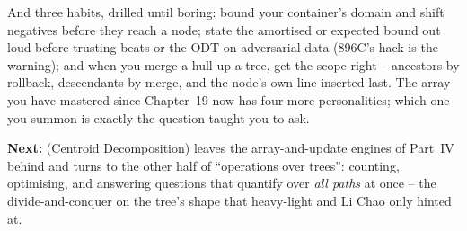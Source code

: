 \begin{lastword}
\medskip
And three habits, drilled until boring: bound your container's domain and shift negatives before they
reach a node; state the amortised or expected bound out loud before trusting beats or the ODT on
adversarial data (896C's hack is the warning); and when you merge a hull up a tree, get the scope
right -- ancestors by rollback, descendants by merge, and the node's own line inserted last. The array
you have mastered since Chapter~19 now has four more personalities; which one you summon is exactly the
question  taught you to ask.

\medskip
\textbf{Next:}  (Centroid Decomposition) leaves the array-and-update engines of Part~IV
behind and turns to the other half of ``operations over trees'': counting, optimising, and answering
questions that quantify over \emph{all paths} at once -- the divide-and-conquer on the tree's shape
that heavy-light and Li Chao only hinted at.
\end{lastword}
